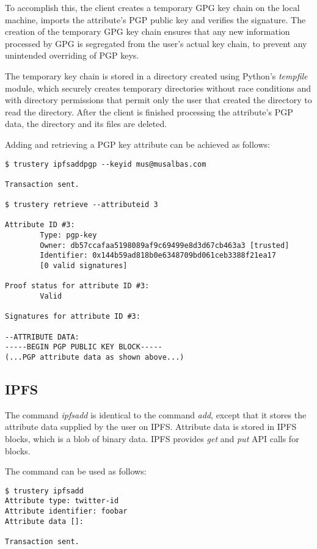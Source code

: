 \documentclass[12pt]{report}
\begin{document}
	To accomplish this, the client creates a temporary GPG key chain on the local machine, imports the attribute's PGP public key and verifies the signature. The creation of the temporary GPG key chain ensures that any new information processed by GPG is segregated from the user's actual key chain, to prevent any unintended overriding of PGP keys.
	
	The temporary key chain is stored in a directory created using Python's \textit{tempfile} module, which securely creates temporary directories without race conditions and with directory permissions that permit only the user that created the directory to read the directory. After the client is finished processing the attribute's PGP data, the directory and its files are deleted.
	
	Adding and retrieving a PGP key attribute can be achieved as follows:
	\begin{lstlisting}
$ trustery ipfsaddpgp --keyid mus@musalbas.com

Transaction sent.

$ trustery retrieve --attributeid 3

Attribute ID #3:
        Type: pgp-key
        Owner: db57ccafaa5198089af9c69499e8d3d67cb463a3 [trusted]
        Identifier: 0x144b59ad818b0e6348709bd061ceb3388f21ea17
        [0 valid signatures]

Proof status for attribute ID #3:
        Valid

Signatures for attribute ID #3:

--ATTRIBUTE DATA:
-----BEGIN PGP PUBLIC KEY BLOCK-----
(...PGP attribute data as shown above...)
	\end{lstlisting}
	
	\subsection{IPFS}
	The command \textit{ipfsadd} is identical to the command \textit{add}, except that it stores the attribute data supplied by the user on IPFS. Attribute data is stored in IPFS blocks, which is a blob of binary data. IPFS provides \textit{get} and \textit{put} API calls for blocks.\cite{24}
	
	The command can be used as follows:
	\begin{lstlisting}
$ trustery ipfsadd
Attribute type: twitter-id
Attribute identifier: foobar
Attribute data []: 

Transaction sent.
	\end{lstlisting}
	
\end{document}
